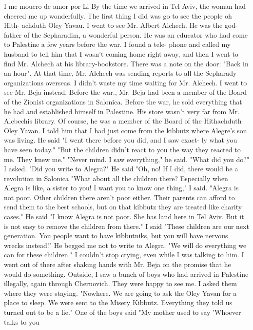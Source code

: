 I me mouero de amor por Li 
By the time we arrived in Tel Aviv, the woman had cheered me up 
wonderfully.
The first thing I did was go to see the people oh Hith-
achduth Oley Yavau.
I went to see Mr.
Albert Alchech.
He was the god-
father of the Sepharadim, a wonderful person.
He was an educator who 
had come to Palestine a few years before the war.
I found a tele-
phone and called my husband to tell him that I wasn't coming home right 
away, and then I went to find Mr.
Alchech at his library-bookstore.
There was a note on the door: "Back in an hour".
At that time, Mr.
Alchech was sending reports to all the Sepharady organizations overseas.
I didn't waste my time waiting for Mr.
Alchech.
I went to see Mr.
Beja instead.
Before the war., Mr.
Beja had been a member of the Board 
of the Zionist organizations in Salonica.
Before the war, he sold 
everything that he had and established himself in Palestine.
His store 
wasn't very far from Mr.
Alcbechis library.
Of course, he was a member 
of the Board of the Hithachduth Oley Yavan.
I told him that I had just come from the kibbutz where Alegre's 
son was living.
He said "I went there before you did, and I saw exact-
ly what you have seen today."
"But the children didn’t react to you the way they reacted to me.
They knew me."
"Never mind.
I saw everything," he said.
"What did you do?"
I asked.
"Did you write to Alegra?"
He said "Oh, no!
If I did, there would be a revolution in Salonica 
"What about all the children there?
Especially when Alegra is like, 
a sister to you!
I want you to know one thing," I said.
"Alegra is not
poor.
Other children there aren't poor either.
Their parents can afford to send them to the best schools, but on that kibbutz they are treated like charity cases."
He said "I know Alegra is not poor.
She has land here in Tel Aviv.
But it is not easy to remove the children from there."
I said "These children are our next generation.
You people want 
to have kibbutniks, but you will have nervous wrecks instead!"
He begged me not to write to Alegra.
"We will do everything we can 
for these children."
I couldn't stop crying, even while I was talking to him.
I went 
out of there after shaking hands with Mr.
Beja on the promise that he 
would do something.
Outside, I saw a bunch of boys who had arrived 
in Palestine illegally, again through Chernovich.
They were happy to 
see me.
I asked them where they were staying.
"Nowhere.
We are going 
to ask the Oley Yavan for a place to sleep.
We were sent to the Misery 
Kibbutz.
Everything they told us turned out to be a lie."
One of the boys said "My mother used to say 'Whoever talks to you 
